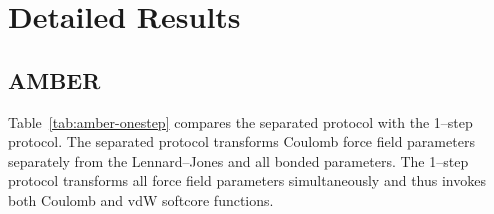 \documentclass[journal=jctcce,manuscript=suppinfo]{achemso}
\begin{document}
\section{Detailed Results}
\label{sec:problems}

\subsection{AMBER}
\label{sec:amber-probs}

Table~\ref{tab:amber-onestep} compares the separated protocol with the
1--step protocol.  The separated protocol transforms Coulomb force
field parameters separately from the Lennard--Jones and all bonded
parameters.  The 1--step protocol transforms all force field
parameters simultaneously and thus invokes both Coulomb and vdW
softcore functions.
\begin{table}
  \begin{minipage}{\linewidth}
    \caption{Comparison between separated and 1--step protocol in
      AMBER.  The data for the 1--step protocol highlights in red problems in
      the code. $\Delta G_\mathrm{sol}$ has been computed with pmemd.  $\Delta G_\mathrm{vac}$ has been computed with sander.}\label{tab:amber-onestep}
\end{minipage}
\end{table}
\end{document}
